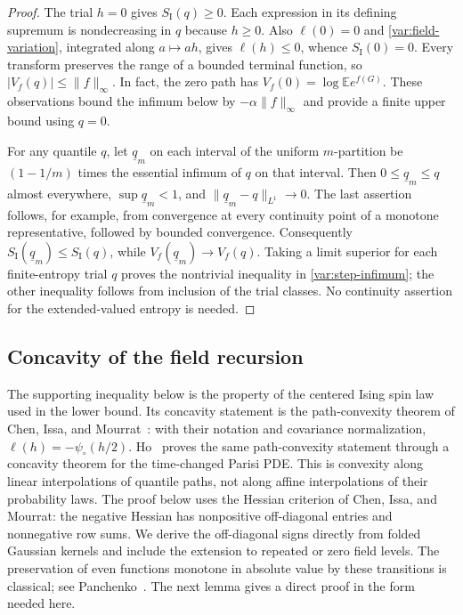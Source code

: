 \begin{proof}
The trial $h=0$ gives $S_{\mathrm I}(q)\ge0$. Each expression
in its defining supremum is nondecreasing in $q$ because $h\ge0$.
Also $\ell(0)=0$ and \eqref{var:field-variation}, integrated
along $a\mapsto ah$, gives $\ell(h)\le0$, whence
$S_{\mathrm I}(0)=0$. Every transform preserves the range of a
bounded terminal function, so $|V_f(q)|\le\|f\|_\infty$.
In fact, the zero path has
$V_f(0)=\log\mathbb E e^{f(G)}$. These observations bound the
infimum below by $-\alpha\|f\|_\infty$ and provide a finite
upper bound using $q=0$.

For any quantile $q$, let $\underline q_m$ on each interval of
the uniform $m$-partition be $(1-1/m)$ times the essential
infimum of $q$ on that interval. Then
$0\le\underline q_m\le q$ almost everywhere,
$\sup\underline q_m<1$, and
$\|\underline q_m-q\|_{L^1}\to0$. The last assertion follows,
for example, from convergence at every continuity point of a
monotone representative, followed by bounded convergence.
Consequently $S_{\mathrm I}(\underline q_m)\le S_{\mathrm I}(q)$,
while $V_f(\underline q_m)\to V_f(q)$.
Taking a limit superior for each finite-entropy trial $q$ proves
the nontrivial inequality in \eqref{var:step-infimum}; the other
inequality follows from inclusion of the trial classes. No
continuity assertion for the extended-valued entropy is needed.
\end{proof}

\subsection{Concavity of the field recursion}

The supporting inequality below is the property of the centered Ising
spin law used in the lower bound. Its concavity statement is the
path-convexity theorem of Chen, Issa, and
Mourrat~\cite[Propositions~2.2 and~2.4]{chenissamourrat2026}: with their
notation and covariance normalization, $\ell(h)=-\psi_{\circ}(h/2)$.
Ho~\cite[Theorem~1.8]{ho2026concavity} proves the same path-convexity
statement through a concavity theorem for the time-changed Parisi PDE.
This is convexity along linear interpolations of quantile paths, not
along affine interpolations of their probability laws. The proof below
uses the Hessian criterion of Chen, Issa, and Mourrat: the negative Hessian has nonpositive
off-diagonal entries and nonnegative row sums. We derive the
off-diagonal signs directly from folded Gaussian kernels and include
the extension to repeated or zero field levels. The preservation of
even functions monotone in absolute value by these transitions is
classical; see Panchenko~\cite[Lemma~2(d)]{panchenko2005question}.
The next lemma gives a direct proof in the form needed here.


